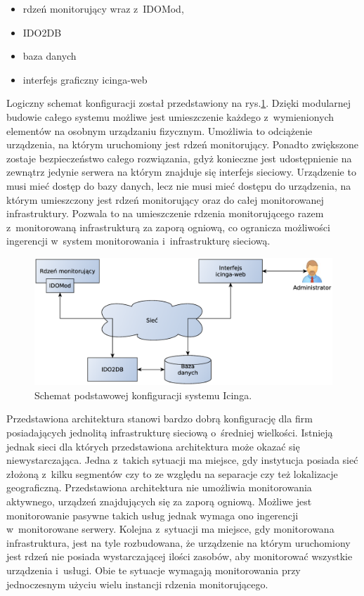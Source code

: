 \begin{itemize}
\item rdzeń monitorujący wraz z~IDOMod,
\item IDO2DB
\item baza danych
\item interfejs graficzny icinga-web
\end{itemize}

Logiczny schemat konfiguracji został przedstawiony na
rys.\ref{fig:icingaBase}. Dzięki modularnej budowie całego systemu
możliwe jest umieszczenie każdego z~wymienionych elementów na osobnym
urządzaniu fizycznym.  Umożliwia to odciążenie urządzenia, na którym
uruchomiony jest rdzeń monitorujący. Ponadto zwiększone zostaje
bezpieczeństwo całego rozwiązania, gdyż konieczne jest udostępnienie
na zewnątrz jedynie serwera na którym znajduje się interfejs
sieciowy. Urządzenie to musi mieć dostęp do bazy danych, lecz nie musi
mieć dostępu do urządzenia, na którym umieszczony jest rdzeń
monitorujący oraz do całej monitorowanej infrastruktury. Pozwala to na
umieszczenie rdzenia monitorującego razem z~monitorowaną
infrastrukturą za zaporą ogniową, co ogranicza możliwości ingerencji
w~system monitorowania i~infrastrukturę sieciową.

\begin{figure}[ht]
  \caption{Schemat podstawowej konfiguracji systemu Icinga.}
  \label{fig:icingaBase}
\includegraphics[width=1\textwidth]{img/icingaBase}
\end{figure}

Przedstawiona architektura stanowi bardzo dobrą konfigurację dla firm
posiadających jednolitą infrastrukturę sieciową o~średniej
wielkości. Istnieją jednak sieci dla których przedstawiona
architektura może okazać się niewystarczająca. Jedna z~takich sytuacji
ma miejsce, gdy instytucja posiada sieć złożoną z~kilku segmentów czy
to ze względu na separacje czy też lokalizacje
geograficzną. Przedstawiona architektura nie umożliwia monitorowania
aktywnego, urządzeń znajdujących się za zaporą ogniową. Możliwe jest
monitorowanie pasywne takich usług jednak wymaga ono ingerencji
w~monitorowane serwery. Kolejna z~sytuacji ma miejsce, gdy
monitorowana infrastruktura, jest na tyle rozbudowana, że urządzenie
na którym uruchomiony jest rdzeń nie posiada wystarczającej ilości
zasobów, aby monitorować wszystkie urządzenia i~usługi. Obie te
sytuacje wymagają monitorowania przy jednoczesnym użyciu wielu
instancji rdzenia monitorującego.


